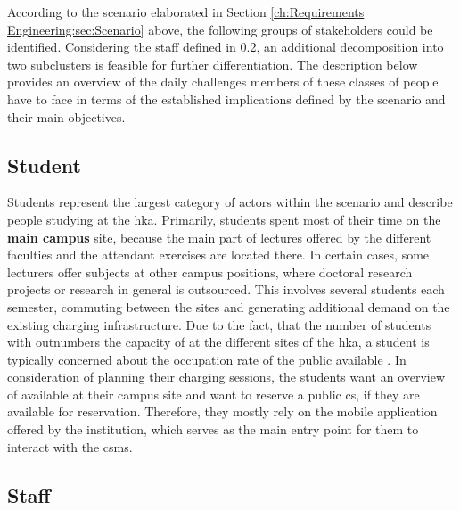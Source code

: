 According to the scenario elaborated in Section \ref{ch:Requirements Engineering:sec:Scenario} above, the following groups of stakeholders could be identified. 
Considering the staff defined in \ref{ch:Requirements Engineering:sec:Stakeholders:ssec:Staff}, an additional decomposition into two subclusters is feasible for further differentiation. 
The description below provides an overview of the daily challenges members of these classes of people have to face in terms of the established implications defined by the scenario and their main objectives. 

\subsection{Student}
\label{ch:Requirements Engineering:sec:Stakeholders:ssec:Student}

Students represent the largest category of actors within the scenario and describe people studying at the \acrshort{hka}. Primarily, students spent most of their time on the \textbf{main campus} site, because the main part of lectures offered by the different faculties and the attendant exercises are located there.
In certain cases, some lecturers offer subjects at other campus positions, where doctoral research projects or research in general is outsourced. This involves several students each semester, commuting between the sites and generating additional demand on the existing charging infrastructure.
Due to the fact, that the number of students with  outnumbers the capacity of  at the different sites of the \acrshort{hka}, a student is typically concerned about the occupation rate of the public available .
In consideration of planning their charging sessions, the students want an overview of available  at their campus site and want to reserve a public \acrshort{cs}, if they are available for reservation.
Therefore, they mostly rely on the mobile application offered by the institution, which serves as the main entry point for them to interact with the \acrshort{csms}. 

\subsection{Staff}
\label{ch:Requirements Engineering:sec:Stakeholders:ssec:Staff}

